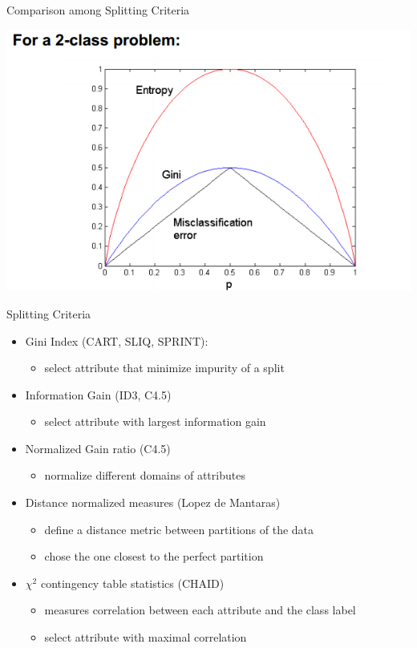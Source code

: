 \documentclass{beamer}
\begin{document}
\begin{frame}{Comparison among Splitting Criteria}
    \begin{center}
        \includegraphics[scale=0.4]{comparingSplittingCritieria.png}
    \end{center}
\end{frame}
\begin{frame}{Splitting Criteria}
    \begin{itemize}
        \item Gini Index (CART, SLIQ, SPRINT):
        \begin{itemize} 
            \item select attribute that minimize impurity of a split 
        \end{itemize}
        \item Information Gain (ID3, C4.5)
        \begin{itemize} 
            \item select attribute with largest information gain
        \end{itemize}
        \item Normalized Gain ratio (C4.5)
        \begin{itemize} 
            \item normalize different domains of attributes
        \end{itemize}
        \item  Distance normalized measures (Lopez de Mantaras)
        \begin{itemize} 
            \item define a distance metric between partitions of the data
            \item chose the one closest to the perfect partition
        \end{itemize}
        \item $\chi^2$ contingency table statistics (CHAID)
        \begin{itemize} 
            \item measures correlation between each attribute and the class label
            \item select attribute with maximal correlation
        \end{itemize}
    \end{itemize}
\end{frame}
\end{document}
